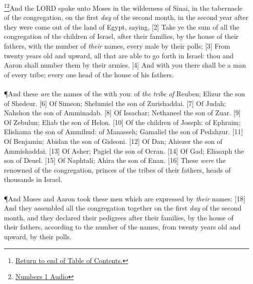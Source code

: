 \footnote{\textcolor[cmyk]{0.99998,1,0,0}{\hyperlink{TOC}{Return to end of Table of Contents.}}}\footnote{\href{https://audiobible.com/bible/numbers_1.html}{\textcolor[cmyk]{0.99998,1,0,0}{Numbers 1 Audio}}}\textcolor[cmyk]{0.99998,1,0,0}{And the LORD spake unto Moses in the wilderness of Sinai, in the tabernacle of the congregation, on the first \emph{day} of the second month, in the second year after they were come out of the land of Egypt, saying,}
[2] \textcolor[cmyk]{0.99998,1,0,0}{Take ye the sum of all the congregation of the children of Israel, after their families, by the house of their fathers, with the number of \emph{their} names, every male by their polls; }
[3] \textcolor[cmyk]{0.99998,1,0,0}{From twenty years old and upward, all that are able to go forth  in Israel: thou and Aaron shall number them by their armies.}
[4] \textcolor[cmyk]{0.99998,1,0,0}{And with you there shall be a man of every tribe; every one head of the house of his fathers.}\\
\\
\P \textcolor[cmyk]{0.99998,1,0,0}{And these \emph{are} the names of the  with you: of \emph{the} \emph{tribe} \emph{of} Reuben; Elizur the son of Shedeur.}
[6] \textcolor[cmyk]{0.99998,1,0,0}{Of Simeon; Shelumiel the son of Zurishaddai. }
[7] \textcolor[cmyk]{0.99998,1,0,0}{Of Judah; Nahshon the son of Amminadab.} 
[8] \textcolor[cmyk]{0.99998,1,0,0}{Of Issachar; Nethaneel the son of Zuar. }
[9] \textcolor[cmyk]{0.99998,1,0,0}{Of Zebulun; Eliab the son of Helon.}
[10] \textcolor[cmyk]{0.99998,1,0,0}{Of the children of Joseph: of Ephraim; Elishama the son of Ammihud: of Manasseh; Gamaliel the son of Pedahzur.}
[11] \textcolor[cmyk]{0.99998,1,0,0}{Of Benjamin; Abidan the son of Gideoni. }
[12] \textcolor[cmyk]{0.99998,1,0,0}{Of Dan; Ahiezer the son of Ammishaddai. }
[13] \textcolor[cmyk]{0.99998,1,0,0}{Of Asher; Pagiel the son of Ocran. }
[14] \textcolor[cmyk]{0.99998,1,0,0}{Of Gad; Eliasaph the son of Deuel.}
[15] \textcolor[cmyk]{0.99998,1,0,0}{Of Naphtali; Ahira the son of Enan.}
[16] \textcolor[cmyk]{0.99998,1,0,0}{These \emph{were} the renowned of the congregation, princes of the tribes of their fathers, heads of thousands in Israel.}\\
\\
\P \textcolor[cmyk]{0.99998,1,0,0}{And Moses and Aaron took these men which are expressed by \emph{their} names:}
[18] \textcolor[cmyk]{0.99998,1,0,0}{And they assembled all the congregation together on the first \emph{day} of the second month, and they declared their pedigrees after their families, by the house of their fathers, according to the number of the names, from twenty years old and upward, by their polls.}
